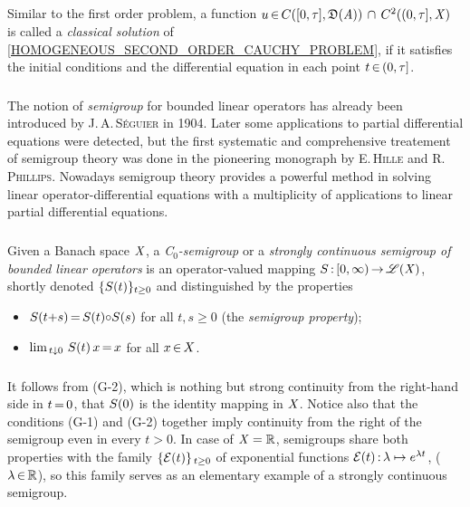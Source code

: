 \documentclass[11pt,twoside]{article}
\begin{document}
\subparagraph*{}
Similar to the first order problem,
a function $u \xeof C([0,\T],\domain{\linA}) \, \cap \, C^2((0,\T],\banX)$
is called a \textit{classical solution}
of \eqref{HOMOGENEOUS_SECOND_ORDER_CAUCHY_PROBLEM},
if it satisfies the initial conditions and
the differential equation in each point $t \xeof (0,\T]$.

\subsubsection*{} %
The notion of \textit{semigroup} for bounded linear operators
has already been introduced by \textsc{J.\,A.\,S\'{e}guier} in 1904.
Later some applications to partial differential equations were detected,
but the first systematic and comprehensive treatement of semigroup theory
was done in the pioneering monograph \cite{HP}
by \textsc{E.\,Hille} and \textsc{R.\,Phillips}.
Nowadays semigroup theory provides a powerful method
in solving linear operator-differential equations
with a multiplicity of applications to linear partial differential equations.

\subparagraph*{} %
Given a Banach space $\banX$,
a \textit{C$_0$-semigroup} or
a \textit{strongly continuous semigroup of bounded linear operators}
is an operator-valued mapping $\linS \: [0,\infty) \xto \BO{\banX}$,
shortly denoted $\{\linS(t)\}_{t \geq 0}$
and distinguished by the properties

\begin{itemize}[leftmargin=15pt]
\item[(G-1)]
$\linS(t{+}s) \eq \linS(t) {\circ} \linS(s)$ for all $t,s \geq 0$
(the \textit{semigroup property});

\item[(G-2)]
$\lim_{\,t \downarrow 0} \, \linS(t)\,x \eq x$ for all $x \xeof X$.
\end{itemize}

\subparagraph*{}
It follows from (G-2),
which is nothing but strong continuity from the right-hand side in $t \eq 0$,
that $\linS(0)$ is the identity mapping in $\banX$.
Notice also
that the conditions (G-1) and (G-2) together
imply continuity from the right of the semigroup even in every $t > 0$.
In case of $\banX=\R$,
semigroups share both properties
with the family $\{\cal{E}(t)\}_{\, t \geq 0}$ of exponential functions
$\cal{E}(t) \: \lambda \mapsto e^{\lambda t}$, ($\lambda \xeof \R$),
so this family serves as an elementary example
of a strongly continuous semigroup.
\end{document}
